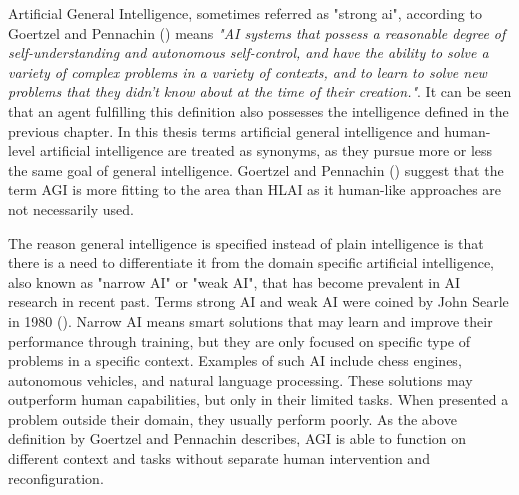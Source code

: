 \documentclass[utf8,english]{gradu3}
\begin{document}

Artificial General Intelligence, sometimes referred as "strong ai", according to Goertzel and Pennachin (\cite*{goertzel2007}) means \emph{"AI systems that possess a reasonable degree of self-understanding and autonomous self-control, and have the ability to solve a variety of complex problems in a variety of contexts, and to learn to solve new problems that they didn't know about at the time of their creation."}. It can be seen that an agent fulfilling this definition also possesses the intelligence defined in the previous chapter. In this thesis terms artificial general intelligence and human-level artificial intelligence are treated as synonyms, as they pursue more or less the same goal of general intelligence. Goertzel and Pennachin (\cite*{goertzel2007}) suggest that the term AGI is more fitting to the area than HLAI as it human-like approaches are not necessarily used. 

 The reason general intelligence is specified instead of plain intelligence is that there is a need to differentiate it from the domain specific artificial intelligence, also known as "narrow AI" or "weak AI", that has become prevalent in AI research in recent past. Terms strong AI and weak AI were coined by John Searle in 1980 (\cite{searle1980}). Narrow AI means smart solutions that may learn and improve their performance through training, but they are only focused on specific type of problems in a specific context. Examples of such AI include chess engines, autonomous vehicles, and natural language processing. These solutions may outperform human capabilities, but only in their limited tasks. When presented a problem outside their domain, they usually perform poorly.
As the above definition by Goertzel and Pennachin describes, AGI is able to function on different context and tasks without separate human intervention and reconfiguration.
\end{document}
